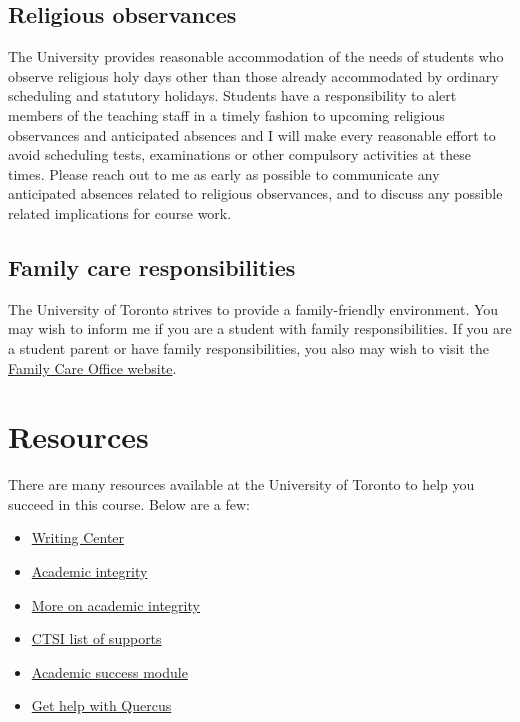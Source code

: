 \documentclass[
]{article}
\providecommand{\tightlist}{%
  \setlength{\itemsep}{0pt}\setlength{\parskip}{0pt}}
\begin{document}
\subsection{Religious observances}\label{religious-observances}

The University provides reasonable accommodation of the needs of
students who observe religious holy days other than those already
accommodated by ordinary scheduling and statutory holidays. Students
have a responsibility to alert members of the teaching staff in a timely
fashion to upcoming religious observances and anticipated absences and I
will make every reasonable effort to avoid scheduling tests,
examinations or other compulsory activities at these times. Please reach
out to me as early as possible to communicate any anticipated absences
related to religious observances, and to discuss any possible related
implications for course work.

\subsection{Family care
responsibilities}\label{family-care-responsibilities}

The University of Toronto strives to provide a family-friendly
environment. You may wish to inform me if you are a student with family
responsibilities. If you are a student parent or have family
responsibilities, you also may wish to visit the
\href{https://familycare.utoronto.ca}{Family Care Office website}.

\section{Resources}\label{resources}

There are many resources available at the University of Toronto to help
you succeed in this course. Below are a few:

\begin{itemize}
\tightlist
\item
  \href{https://writing.utoronto.ca/}{Writing Center}
\item
  \href{https://www.academicintegrity.utoronto.ca/}{Academic integrity}
\item
  \href{https://studentlife.utoronto.ca/wp-content/uploads/SLC8581_7-Grandfathers-in-Academic-Integrity-AODA.pdf}{More
  on academic integrity}
\item
  \href{https://teaching.utoronto.ca/teaching-support/u-of-t-resources/teaching/students/}{CTSI
  list of supports}
\item
  \href{https://q.utoronto.ca/enroll/ALEYMP}{Academic success module}
\item
  \href{https://q.utoronto.ca/courses/46670/pages/student-guide}{Get
  help with Quercus}
\end{itemize}
\end{document}
